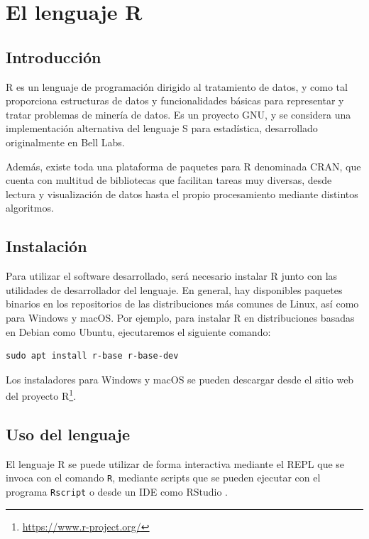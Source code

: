 \section{El lenguaje R}\label{introducciuxf3n-a-r}

\subsection{Introducción}

R \autocite{rlang} es un lenguaje de programación dirigido al tratamiento de datos, y
como tal proporciona estructuras de datos y funcionalidades básicas para
representar y tratar problemas de minería de datos. Es un proyecto GNU, y se considera una implementación alternativa del lenguaje S para estadística, desarrollado originalmente en Bell Labs.

Además, existe toda
una plataforma de paquetes para R denominada CRAN, que cuenta con
multitud de bibliotecas que facilitan tareas muy diversas, desde lectura y
visualización de datos hasta el propio procesamiento mediante distintos
algoritmos.

\subsection{Instalación}

Para utilizar el software desarrollado, será necesario instalar R junto con las utilidades de desarrollador del lenguaje. En general, hay disponibles paquetes binarios en los repositorios de las distribuciones más comunes de Linux, así como para Windows y macOS. Por ejemplo, para instalar R en distribuciones basadas en Debian como Ubuntu, ejecutaremos el siguiente comando:

\begin{verbatim}
sudo apt install r-base r-base-dev
\end{verbatim}

Los instaladores para Windows y macOS se pueden descargar desde el sitio web del proyecto R\footnote{\url{https://www.r-project.org/}}.

\subsection{Uso del lenguaje}

El lenguaje R se puede utilizar de forma interactiva mediante el REPL que se invoca con el comando \texttt{R}, mediante scripts que se pueden ejecutar con el programa \texttt{Rscript} o desde un IDE como RStudio \autocite{rstudio}.

